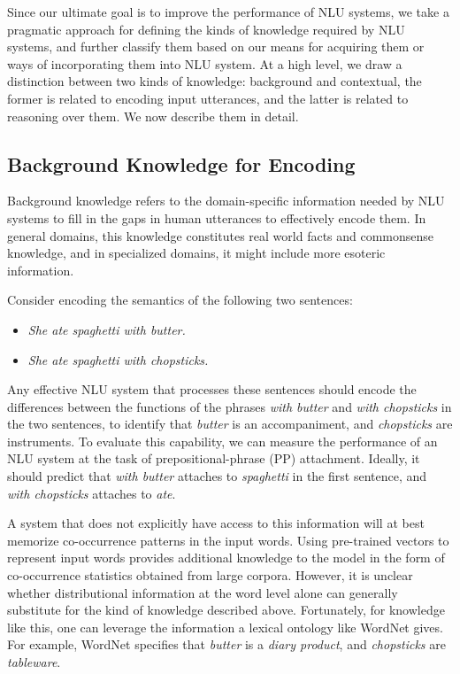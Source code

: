 Since our ultimate goal is to improve the performance of NLU systems, we take a pragmatic approach for defining the kinds of knowledge required
by NLU systems, and further classify them based on our means for acquiring them or ways of incorporating them into NLU system.
At a high level, we draw a distinction between two kinds of knowledge: background and contextual, the former is related to encoding input utterances, and the latter is related to
reasoning over them. We now describe them in detail.

\subsection{Background Knowledge for Encoding}
Background knowledge refers to the domain-specific information needed by NLU systems to fill in the gaps in human utterances to effectively encode them. In general domains,
this knowledge constitutes real world facts and commonsense knowledge, and in specialized domains,
it might include more esoteric information.

Consider encoding the semantics of the following two sentences:
\begin{itemize}
 \item[] \textit{She ate spaghetti with butter.}
 \item[] \textit{She ate spaghetti with chopsticks.}
\end{itemize}
Any effective NLU system that processes these sentences should encode the differences between the functions of the phrases \textit{with butter} and \textit{with chopsticks}
in the two sentences, to identify that \textit{butter} is an accompaniment, and \textit{chopsticks} are instruments. To evaluate this capability, we can measure
the performance of an NLU system at the task of prepositional-phrase (PP) attachment. Ideally, it should predict that \textit{with butter} attaches to
\textit{spaghetti} in the first sentence, and \textit{with chopsticks} attaches to \textit{ate}.

A system that does not explicitly have access to this information will at best memorize co-occurrence patterns in the input words.
Using pre-trained vectors to represent input words provides additional knowledge to the model in the
form of co-occurrence statistics obtained from large corpora. However, it is unclear whether distributional
information at the word level alone can generally substitute for the kind of knowledge described above. Fortunately, for knowledge like this, one can leverage the
information a lexical ontology like WordNet \citep{miller1995wordnet} gives. For example, WordNet specifies that \textit{butter} is a \textit{diary product}, and
\textit{chopsticks} are \textit{tableware}.

